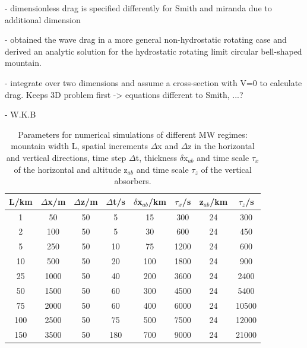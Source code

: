 - dimensionless drag is specified differently for Smith and miranda due to additional dimension

- \textcite{miranda_non-linear_1992} obtained the wave drag in a more general non-hydrostatic rotating case and derived an analytic solution for the hydrostatic rotating limit circular bell-shaped mountain. 

- integrate over two dimensions and assume a cross-section with V=0 to calculate drag. Keeps 3D problem first -> equations different to Smith, ...?

- W.K.B


\begin{table}[ht]
\centering
\caption{Parameters for numerical simulations of different MW regimes: mountain width L, spatial increments $\Delta$x and $\Delta$z in the horizontal and vertical directions, time step $\Delta$t, thickness $\delta$x$_{ab}$ and time scale $\tau_x$ of the horizontal and altitude z$_{ab}$ and time scale $\tau_z$ of the vertical absorbers.}

\begin{tabular}{@{}cccccccc@{}}
\toprule
L/km & $\Delta$x/m & $\Delta$z/m & $\Delta$t/s & $\delta$x$_{ab}$/km & $\tau_x$/s  & z$_{ab}$/km & $\tau_z$/s \\ \midrule[1pt]

1   & 50  & 50 & 5   & 15  & 300  & 24 & 300   \\
2   & 100  & 50 & 5   & 30  & 600  & 24 & 450   \\
5   & 250  & 50 & 10  & 75  & 1200 & 24 & 600  \\
10  & 500 & 50 & 20  & 100 & 1800 & 24 & 900  \\
25  & 1000 & 50 & 40  & 200 & 3600 & 24 & 2400  \\
50  & 1500 & 50 & 60  & 300 & 4500 & 24 & 5400  \\
75  & 2000 & 50 & 60  & 400 & 6000 & 24 & 10500 \\
100 & 2500 & 50 & 75  & 500 & 7500 & 24 & 12000 \\
150 & 3500 & 50 & 180 & 700 & 9000 & 24 & 21000 \\

\bottomrule
\end{tabular}
\label{tab:linearRegimes}
\end{table}


